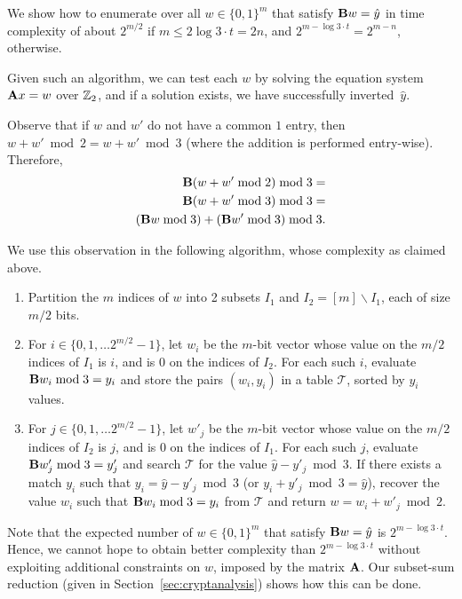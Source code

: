 We show how to enumerate over all $w \in \{0,1\}^m$ that satisfy $\mat{B} w = \hat{y}$ in time complexity of about $2^{m/2}$ if $m \leq 2 \log 3 \cdot t = 2 n$, and $2^{m - \log 3 \cdot t} = 2^{m - n}$, otherwise.

Given such an algorithm, we can test each $w$ by solving the equation system $\mat{A}x = w$ over $\mathbb{Z}_2$, and if a solution exists, we have successfully inverted~$\hat{y}$.

Observe that if $w$ and $w'$ do not have a common $1$ entry, then $w + w' \bmod 2 = w + w' \bmod 3$
(where the addition is performed entry-wise). Therefore,
\begin{align}
\label{eq:lineara}
\begin{split}
\mat{B}(w + w' \bmod 2) \bmod 3 = \\
\mat{B}(w + w' \bmod 3) \bmod 3 = \\
(\mat{B}w \bmod 3) + (\mat{B}w' \bmod 3) \bmod 3.
\end{split}
\end{align}

We use this observation in the following algorithm, whose complexity as claimed above.
\begin{enumerate}
  \item Partition the $m$ indices of $w$ into 2 subsets $I_1$ and $I_2 = [m] \backslash I_1$, each of size $m/2$ bits.
  \item For $i \in \{0,1,\ldots 2^{m/2} - 1\}$, let $w_i$ be the $m$-bit vector whose value on the $m/2$ indices of $I_1$ is $i$, and is 0 on the indices of $I_2$. For each such $i$,
      evaluate $\mat{B} w_i \bmod 3 = y_i$ and store the pairs $(w_i,y_i)$ in a table $\mathcal{T}$, sorted by $y_i$ values.
  \item For $j \in \{0,1,\ldots 2^{m/2} - 1\}$, let $w'_j$ be the $m$-bit vector whose value on the $m/2$ indices of $I_2$ is $j$, and is 0 on the indices of $I_1$. For each such $j$,
      evaluate $\mat{B} w'_j \bmod 3 = y'_j$ and search $\mathcal{T}$ for the value $\hat{y} - y'_j \bmod 3$. If there exists a match $y_i$ such that $y_i = \hat{y} - y'_j \bmod 3$ (or $y_i + y'_j \bmod 3 = \hat{y}$), recover the value $w_i$ such that $\mat{B} w_i \bmod 3 = y_i$ from $\mathcal{T}$
      and return $w = w_i + w'_j \bmod 2$.
\end{enumerate}

Note that the expected number of $w \in \{0,1\}^m$ that satisfy $\mat{B} w = \hat{y}$ is $2^{m - \log 3 \cdot t}$. Hence, we cannot hope to obtain better complexity than $2^{m - \log 3 \cdot t}$ without exploiting additional constraints on $w$, imposed by the matrix $\mat{A}$. Our
subset-sum reduction (given in Section~\ref{sec:cryptanalysis}) shows how this can be done.

